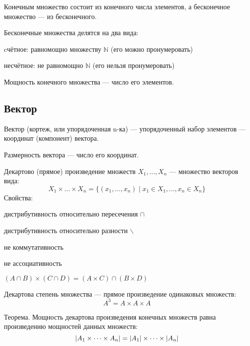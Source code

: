 {\bold Конечным} множество состоит из {\ital конечного} числа элементов, а {\bold бесконечное} множество --- из {\ital бесконечного}.

\begin{theorem}
{\ital Бесконечные} множества делятся на два вида:
\begin{list*}
\item {\bold cчётное}: равномощно множеству $\mathbb{N}$ {\ital\color{desc} (его можно пронумеровать)}
\item {\bold несчётное}: не равномощно $\mathbb{N}$ {\ital\color{desc} (его нельзя пронумеровать)}
\end{list*}
\end{theorem}

{\bold Мощность} {\ital конечного} множества --- число его элементов.

\subsection{Вектор}

{\bold Вектор} {\ital (кортеж, или упорядоченная n-ка)} --- упорядоченный набор элементов --- {\ital координат (компонент)} вектора.

{\bold Размерность} вектора --- число его координат.

\begin{theorem}
{\bold Декартово} {\ital (прямое)} {\bold произведение} множеств $X_1,\dots,X_n$ --- множество векторов вида:
$$X_1\times\dots\times X_n=\{(x_1,\dots,x_n)\mid x_1\in X_1,\dots,x_n\in X_n\}$$
Свойства:
\begin{list*}
\item дистрибутивность относительно {\ital пересечения} $\cap$
\item дистрибутивность относительно {\ital разности} $\backslash$
\item {\ital *не коммутативность}
\item {\ital *не ассоциативность}
\item $(A\cap B)\times(C\cap D)=(A\times C)\cap(B\times D)$
\end{list*}
\end{theorem}
{\bold Декартова степень} множества --- прямое произведение одинаковых множеств:
$$A^3=A\times A\times A$$
\begin{theorem}
{\bold Теорема.} Мощность декартова произведения конечных множеств равна {\ital произведению мощностей} данных множеств:
$$\left|A_1\times\dots\times A_n\right|=\left|A_1\right|\times\dots\times\left|A_n\right|$$
\end{theorem}

